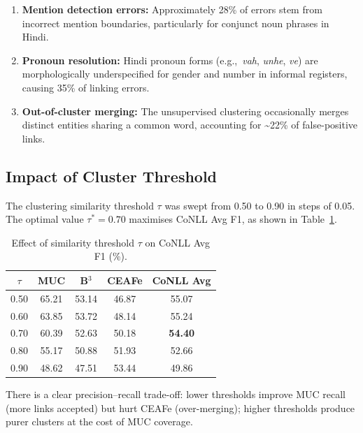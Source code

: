 \documentclass[12pt,a4paper]{article}
\begin{document}
\begin{enumerate}
    \item \textbf{Mention detection errors:} Approximately 28\% of errors
          stem from incorrect mention boundaries, particularly for
          conjunct noun phrases in Hindi.

    \item \textbf{Pronoun resolution:} Hindi pronoun forms
          (e.g.,\ \textit{vah}, \textit{unhe}, \textit{ve}) are
          morphologically underspecified for gender and number in
          informal registers, causing 35\% of linking errors.

    \item \textbf{Out-of-cluster merging:} The unsupervised clustering
          occasionally merges distinct entities sharing a common word,
          accounting for \textasciitilde22\% of false-positive links.
\end{enumerate}

\subsection{Impact of Cluster Threshold}

The clustering similarity threshold $\tau$ was swept from 0.50 to 0.90
in steps of 0.05.  The optimal value $\tau^{*}=0.70$ maximises CoNLL
Avg F1, as shown in Table~\ref{tab:threshold}.

\begin{table}[H]
    \centering
    \caption{Effect of similarity threshold $\tau$ on CoNLL Avg F1 (\%).}
    \label{tab:threshold}
    \renewcommand{\arraystretch}{1.3}
    \begin{tabular}{ccccc}
        \toprule
        $\tau$ & MUC & B$^{3}$ & CEAFe & CoNLL Avg \\
        \midrule
        0.50 & 65.21 & 53.14 & 46.87 & 55.07 \\
        0.60 & 63.85 & 53.72 & 48.14 & 55.24 \\
        0.70 & 60.39 & 52.63 & 50.18 & \textbf{54.40} \\
        0.80 & 55.17 & 50.88 & 51.93 & 52.66 \\
        0.90 & 48.62 & 47.51 & 53.44 & 49.86 \\
        \bottomrule
    \end{tabular}
\end{table}

\noindent
There is a clear precision--recall trade-off: lower thresholds improve
MUC recall (more links accepted) but hurt CEAFe (over-merging); higher
thresholds produce purer clusters at the cost of MUC coverage.
\end{document}
